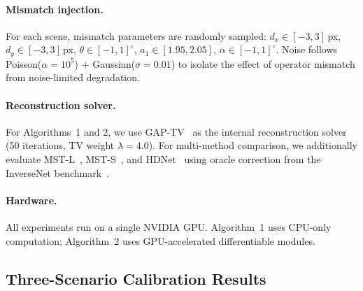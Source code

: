 \documentclass[runningheads]{llncs}
\begin{document}
\paragraph{Mismatch injection.}
For each scene, mismatch parameters are randomly sampled:
$d_x \in [-3, 3]$\,px, $d_y \in [-3, 3]$\,px, $\theta \in [-1, 1]^\circ$, $a_1 \in [1.95, 2.05]$, $\alpha \in [-1, 1]^\circ$.
Noise follows Poisson($\alpha = 10^5$) + Gaussian($\sigma = 0.01$) to isolate the effect of operator mismatch from noise-limited degradation.

\paragraph{Reconstruction solver.}
For Algorithms~1 and 2, we use GAP-TV~\cite{yuan2016gaptv} as the internal reconstruction solver (50 iterations, TV weight $\lambda = 4.0$).
For multi-method comparison, we additionally evaluate MST-L~\cite{cai2022mst}, MST-S~\cite{cai2022mst}, and HDNet~\cite{hu2022hdnet} using oracle correction from the InverseNet benchmark~\cite{yang2025inversenet}.

\paragraph{Hardware.}
All experiments run on a single NVIDIA GPU.
Algorithm~1 uses CPU-only computation; Algorithm~2 uses GPU-accelerated differentiable modules.

\subsection{Three-Scenario Calibration Results}
\label{sec:main_results}
\end{document}
